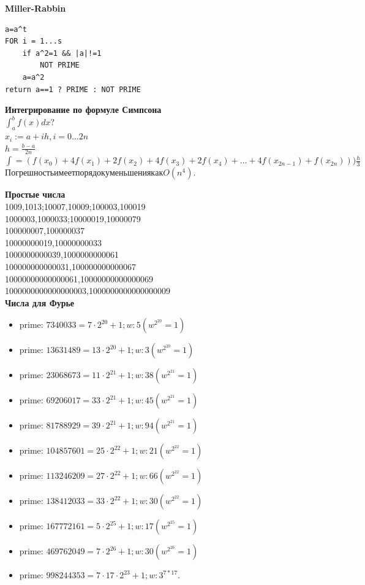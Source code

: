 \documentclass[a4paper,10pt, twocolumn]{article}
\begin{document}
{\bf Miller-Rabbin}
\begin{verbatim}
a=a^t
FOR i = 1...s
    if a^2=1 && |a|!=1
        NOT PRIME
    a=a^2
return a==1 ? PRIME : NOT PRIME
\end{verbatim}


{\bf Интегрирование по формуле Симпсона}\\
$\int_a^b f(x)dx ?$\\
$x_i := a+ih, i=0\ldots 2n$\\
$h = \frac {b-a} {2n}$\\

$\int = (f(x_0)+4f(x_1)+2f(x_2)+4f(x_3)+2f(x_4)+\ldots+4f(x_{2n-1})+f(x_{2n}))) \frac h 3$\\
$Погрешность имеет порядок уменьшения как O(n^4).$

{\bf Простые числа}\\
1009,1013;10007,10009;100003,100019\\
1000003,1000033;10000019,10000079\\
100000007,100000037\\
10000000019,10000000033\\
1000000000039,1000000000061\\
100000000000031,100000000000067\\
10000000000000061,10000000000000069\\
1000000000000000003,1000000000000000009\\

{\bf Числа для Фурье}\\
\begin{itemize}
\item prime: $7340033 = 7·2^{20} + 1; w: 5 (w^{2^{20}} = 1)$
\item prime: $13631489 = 13·2^{20} + 1; w: 3 (w^{2^{20}} = 1)$
\item prime: $23068673 = 11·2^{21} + 1; w: 38 (w^{2^{21}} = 1)$
\item prime: $69206017 = 33·2^{21} + 1; w: 45 (w^{2^{21}} = 1)$
\item prime: $81788929 = 39·2^{21} + 1; w: 94 (w^{2^{21}} = 1)$
\item prime: $104857601 = 25·2^{22} + 1; w: 21 (w^{2^{22}} = 1)$
\item prime: $113246209 = 27·2^{22} + 1; w: 66 (w^{2^{22}} = 1)$
\item prime: $138412033 = 33·2^{22} + 1; w: 30 (w^{2^{22}} = 1)$
\item prime: $167772161 = 5·2^{25} + 1; w: 17 (w^{2^{25}} = 1)$
\item prime: $469762049 = 7·2^{26} + 1; w: 30 (w^{2^{26}} = 1)$
\item prime: $998244353 = 7·17·2^{23} + 1; w: 3^{7 * 17}$.
\end{itemize}
\end{document}
